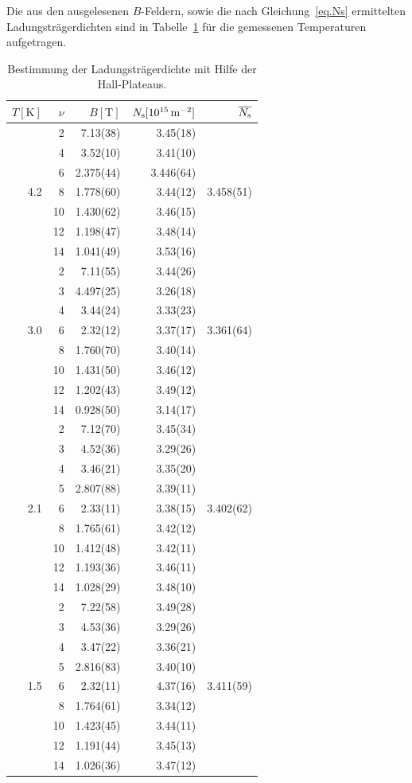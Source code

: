 \documentclass[paper=a4,fontsize=10pt,DIV=18,twocolumn,parskip=half]{scrartcl}
\numberwithin{equation}{section}    %
\newcommand{\kor}[1]{{\color{darkgreen}#1}}
\begin{document}
Die aus den ausgelesenen $B$-Feldern, sowie die nach Gleichung~\eqref{eq.Ns} ermittelten Ladungsträgerdichten sind in Tabelle~\ref{ladungstraegerdichte2} für die gemessenen Temperaturen aufgetragen.
\begin{table}[htp]
	\begin{center}
	\kor{\begin{tabular}{r|rrr|r}
		\hline
			$T[\mathrm{K}]$ & $\nu$ & $B[\mathrm{T}]$ & $N_{\rm s}[10^{15}\,\mathrm{m}^{-2}]$ & $\overline{N_{\rm s}}$\\
		\hline
			 &  2 & 7.13(38) & 3.45(18)&\\
			 &  4 & 3.52(10) & 3.41(10)&\\
			 &  6 & 2.375(44) & 3.446(64)&\\
			4.2 &  8 & 1.778(60) & 3.44(12)& 3.458(51)\\
			 & 10 & 1.430(62) & 3.46(15)&\\
			 & 12 & 1.198(47) & 3.48(14)&\\
			 & 14 & 1.041(49) & 3.53(16)&\\
			\hline
			 &  2 & 7.11(55) & 3.44(26)&\\
			 &  3 & 4.497(25) & 3.26(18)&\\
			 &  4 & 3.44(24) & 3.33(23)&\\
			3.0 &  6 & 2.32(12) & 3.37(17)& 3.361(64)\\
			 &  8 & 1.760(70) & 3.40(14)&\\
			 & 10 & 1.431(50) & 3.46(12)&\\
			 & 12 & 1.202(43) & 3.49(12)&\\
			 & 14 & 0.928(50) & 3.14(17)&\\
			\hline
			 &  2 & 7.12(70) & 3.45(34)&\\
			 &  3 & 4.52(36) & 3.29(26)&\\
			 &  4 & 3.46(21) & 3.35(20)&\\
			 &  5 & 2.807(88) & 3.39(11)&\\
			2.1 &  6 & 2.33(11) & 3.38(15)& 3.402(62)\\
			 &  8 & 1.765(61) & 3.42(12)&\\
			 & 10 & 1.412(48) & 3.42(11)&\\
			 & 12 & 1.193(36) & 3.46(11)&\\
			 & 14 & 1.028(29) & 3.48(10)&\\
			\hline
			 &  2 & 7.22(58) & 3.49(28)&\\
			 &  3 & 4.53(36) & 3.29(26)&\\
			 &  4 & 3.47(22) & 3.36(21)&\\
			 &  5 & 2.816(83) & 3.40(10)&\\
			1.5 &  6 & 2.32(11) & 4.37(16)& 3.411(59)\\
			 &  8 & 1.764(61) & 3.34(12)&\\
			 & 10 & 1.423(45) & 3.44(11)&\\
			 & 12 & 1.191(44) & 3.45(13)&\\
			 & 14 & 1.026(36) & 3.47(12)&\\
		\hline	
	\end{tabular}}
	\caption{Bestimmung der Ladungsträgerdichte mit Hilfe der Hall-Plateaus.}
	\label{ladungstraegerdichte2}
	\end{center}
\end{table}
\end{document}
